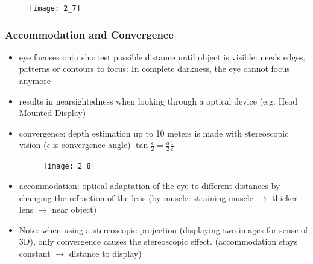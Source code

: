 \documentclass{standalone}
\begin{document}
\begin{figure}[H]
	\texttt{[image: 2\_7]}
\end{figure}

\subsubsection{Accommodation and Convergence}
\begin{itemize}
	\item eye focuses onto shortest possible distance until object is visible: needs edges, patterns or contours to focus: In complete darkness, the eye cannot focus anymore
	\item results in nearsightedness when looking through a optical device (e.g. Head Mounted Display)
	\item convergence: depth estimation up to 10 meters is made with stereoscopic vision ($\epsilon$ is convergence angle) $\tan \frac{\epsilon}{2} = \frac{a}{2} \frac{1}{e}$
	
	\begin{figure}[H]
		\texttt{[image: 2\_8]}
	\end{figure}
	
	\item accommodation: optical adaptation of the eye to different distances by changing the refraction of the lens (by muscle: straining muscle $\rightarrow$ thicker lens $\rightarrow$ near object)
	\item Note: when using a stereoscopic projection (displaying two images for sense of 3D), only convergence causes the stereoscopic effect. (accommodation stays constant $\rightarrow$ distance to display)
\end{itemize}


\setcounter{subsubsection}{4}
\end{document}
